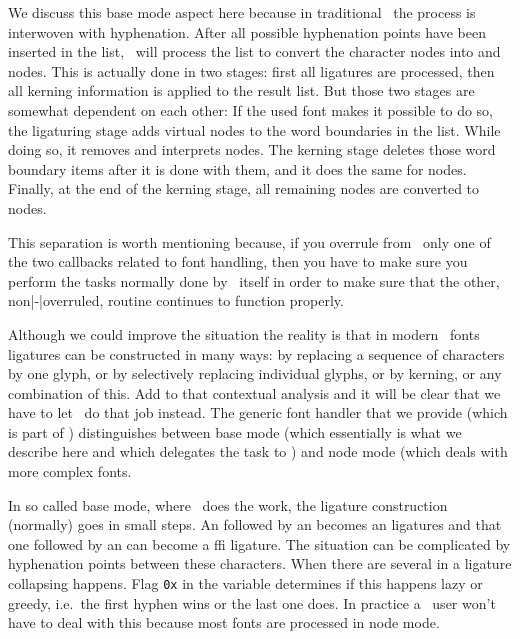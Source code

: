 We discuss this base mode aspect here because in traditional \TEX\ the process is
interwoven with hyphenation. After all possible hyphenation points have been
inserted in the list, \LUATEX\ will process the list to convert the \quote
{character} nodes into  and  nodes. This is
actually done in two stages: first all ligatures are processed, then all kerning
information is applied to the result list. But those two stages are somewhat
dependent on each other: If the used font makes it possible to do so, the
ligaturing stage adds virtual  nodes to the word boundaries in
the list. While doing so, it removes and interprets \type {\noboundary} nodes.
The kerning stage deletes those word boundary items after it is done with them,
and it does the same for  nodes. Finally, at the end of the kerning
stage, all remaining  nodes are converted to 
nodes.

This separation is worth mentioning because, if you overrule from \LUA\ only one
of the two callbacks related to font handling, then you have to make sure you
perform the tasks normally done by \LUATEX\ itself in order to make sure that the
other, non|-|overruled, routine continues to function properly.

Although we could improve the situation the reality is that in modern \OPENTYPE\
fonts ligatures can be constructed in many ways: by replacing a sequence of
characters by one glyph, or by selectively replacing individual glyphs, or by
kerning, or any combination of this. Add to that contextual analysis and it will
be clear that we have to let \LUA\ do that job instead. The generic font handler
that we provide (which is part of \CONTEXT) distinguishes between base mode
(which essentially is what we describe here and which delegates the task to \TEX)
and node mode (which deals with more complex fonts.

In so called base mode, where \TEX\ does the work, the ligature construction
(normally) goes in small steps. An  followed by an \type {f} becomes an
\type {ff} ligatures and that one followed by an \type {i} can become a \type
{ffi} ligature. The situation can be complicated by hyphenation points between
these characters. When there are several in a ligature collapsing happens. Flag
{\tt 0x\tohexadecimal \lazyligatureshyphenationcode} in the \typ
{\hyphenationmode} variable determines if this happens lazy or greedy, i.e.\ the
first hyphen wins or the last one does. In practice a \CONTEXT\ user won't have
to deal with this because most fonts are processed in node mode.

